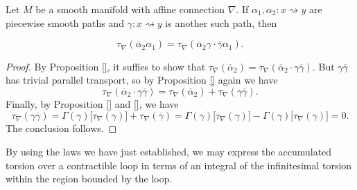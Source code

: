 \begin{proposition}
  Let $M$ be a smooth manifold with affine connection $\nabla$. If $\alpha_1, \alpha_2 \colon x \rightsquigarrow y$ are piecewise smooth paths and $\gamma \colon x \rightsquigarrow y$ is another such path, then

  \begin{equation}
    \tau_\nabla(\overline{\alpha}_2 \alpha_1) = \tau_\nabla( \overline{\alpha}_2 \gamma \cdot \overline{\gamma}\alpha_1).
  \end{equation}
\end{proposition}

\begin{proof}
  By Proposition \ref{}, it suffies to show that $\tau_\nabla(\overline{\alpha}_2) = \tau_\nabla(\overline{\alpha}_2 \cdot \gamma \overline{\gamma})$. But $\gamma \overline{\gamma}$ has trivial parallel transport, so by Proposition \ref{} again we have
  \begin{equation}
    \tau_\nabla( \overline{\alpha}_2 \cdot \gamma \overline{\gamma}) = \tau_\nabla( \overline{\alpha}_2) + \tau_\nabla(\gamma \overline{\gamma}).
  \end{equation}
  Finally, by Proposition \ref{} and \ref{}, we have
  \begin{equation*}
    \tau_\nabla(\gamma \overline{\gamma}) = \Gamma(\gamma)\big[\tau_\nabla(\gamma)\big] + \tau_\nabla(\overline{\gamma}) = \Gamma(\gamma)\big[\tau_\nabla(\gamma)\big] - \Gamma(\gamma)\big[\tau_\nabla(\gamma)\big] = 0.
  \end{equation*}
  The conclusion follows.
\end{proof}

By using the laws we have just established, we may express the accumulated torsion over a contractible loop in terms of an integral of the infinitesimal torsion within the region bounded by the loop.

